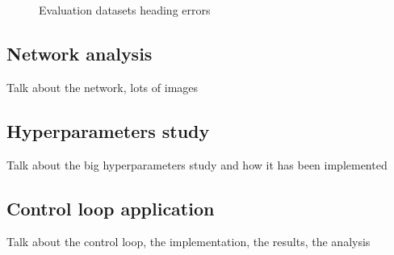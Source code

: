 \documentclass[a4paper,12pt,sort&compress]{article}
\begin{document}
\begin{figure}
    \centering
    \caption{Evaluation datasets heading errors}
    \label{fig:dataset_analysis2}
\end{figure}

\subsection{Network analysis}
    Talk about the network, lots of images  

\subsection{Hyperparameters study}
    Talk about the big hyperparameters study and how it has been implemented

\subsection{Control loop application}
    Talk about the control loop, the implementation, the results, the analysis
\end{document}
